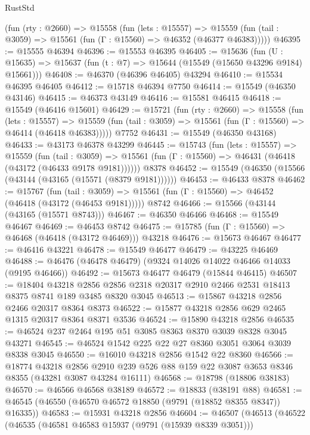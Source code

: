 \begin{lexlean}{RustStd}
\begin{coremodule}
    (fun (rty : @2660) =>
    @15558
      (fun (lets : @15557) =>
      @15559 (fun (tail : @3059) => @15561 (fun (Γ : @15560) => @46352 (@46377 @46383)))))
@46395 := @15555 @46394
@46396 := @15553 @46395
@46405 := @15636
    (fun (U : @15635) => @15637 (fun (t : @7) => @15644 (@15549 (@15650 @43296 @9184) @15661)))
@46408 := @46370 (@46396 @46405) @43294
@46410 := @15534 @46395 @46405
@46412 := @15718 @46394 @7750
@46414 := @15549 (@46350 @43146)
@46415 := @46373 @43149
@46416 := @15581 @46415
@46418 := @15549 (@46416 @15601)
@46429 := @15721
    (fun (rty : @2660) =>
    @15558
      (fun (lets : @15557) =>
      @15559 (fun (tail : @3059) => @15561 (fun (Γ : @15560) => @46414 (@46418 @46383)))))
    @7752
@46431 := @15549 (@46350 @43168)
@46433 := @43173 @46378 @43299
@46445 := @15743
    (fun (lets : @15557) =>
    @15559
      (fun (tail : @3059) =>
      @15561 (fun (Γ : @15560) => @46431 (@46418 (@43172 (@46433 @9178 @9181))))))
    @8378
@46452 := @15549 (@46350 (@15566 (@43144 (@43165 (@15571 (@8379 @9181))))))
@46453 := @46433 @8378
@46462 := @15767
    (fun (tail : @3059) => @15561 (fun (Γ : @15560) => @46452 (@46418 (@43172 (@46453 @9181)))))
    @8742
@46466 := @15566 (@43144 (@43165 (@15571 @8743)))
@46467 := @46350 @46466
@46468 := @15549 @46467
@46469 := @46453 @8742
@46475 := @15785 (fun (Γ : @15560) => @46468 (@46418 (@43172 @46469))) @43218
@46476 := @15673 @46467
@46477 := @46416 @43221
@46478 := @15549 @46477
@46479 := @43225 @46469
@46488 := @46476 (@46478 @46479) (@9324 @14026 @14022 @46466 @14033 (@9195 @46466))
@46492 := @15673 @46477 @46479 (@15844 @46415)
@46507 := @18404
    @43218
    @2856
    @2856
    @2318
    @20317
    @2910
    @2466
    @2531
    @18413
    @8375
    @8741
    @189
    @3485
    @8320
    @3045
@46513 := @15867 @43218 @2856 @2466 @20317 @8364 @8373
@46522 := @15877 @43218 @2856 @629 @2465 @1315 @20317 @8364 @8371 @3536
@46524 := @15890 @43218 @2856
@46535 := @46524 @237 @2464 @195 @51 @3085 @8363 @8370 @3039 @8328 @3045 @43271
@46545 := @46524 @1542 @225 @22 @27 @8360 @3051 @3064 @3039 @8338 @3045
@46550 := @16010 @43218 @2856 @1542 @22 @8360
@46566 := @18774
    @43218
    @2856
    @2910
    @239
    @526
    @88
    @159
    @22
    @3087
    @3653
    @8346
    @8355
    (@43281 @3087 @43284 @16111)
@46568 := @18798 (@18806 @38183)
@46570 := @46566 @46568 @38189
@46572 := @18833 (@38191 @88)
@46581 := @46545 (@46550 (@46570 @46572 @18850 (@9791 (@18852 @8355 @8347)) @16335))
@46583 := @15931 @43218 @2856
@46604 := @46507
    (@46513
      (@46522
        (@46535
          (@46581 @46583 @15937 (@9791 (@15939 @8339 @3051)))

\end{coremodule}
\end{lexlean}
